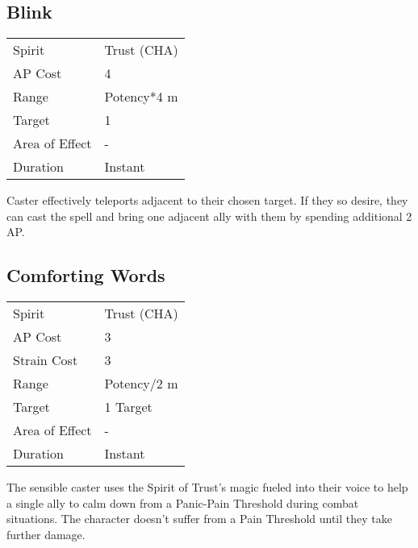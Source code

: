 \documentclass[11pt,a4paper,twocolumn]{book}
\begin{document}
\medskip

\subsection*{Blink}

{
	\begin{tabu} to 70mm{| X[l,4] | X[l,7] |}
		\hline
		Spirit         & Trust (CHA)        \\
		AP Cost        & 4                  \\
		Range          & Potency*4 m \\
		Target         & 1                  \\
		Area of Effect & -                  \\
		Duration       & Instant            \\ \hline
	\end{tabu}
	
}
\smallskip

Caster effectively teleports adjacent to their chosen target. If they so desire, they can cast the spell and bring one adjacent ally with them by spending additional 2 AP.


\subsection*{Comforting Words}
{
	\begin{tabu} to 75mm{| X[l,4] | X[l,7] |}
		\hline
		Spirit         & Trust (CHA) \\
		AP Cost        & 3           \\
		Strain Cost    & 3           \\
		Range          & Potency/2 m \\
		Target         & 1 Target    \\
		Area of Effect & -           \\
		Duration       & Instant     \\ \hline
	\end{tabu}
	
}

\medskip

The sensible caster uses the Spirit of Trust's magic fueled into their voice to help a single ally to calm down from a Panic-Pain Threshold during combat situations. The character doesn't suffer from a Pain Threshold until they take further damage.
\end{document}
